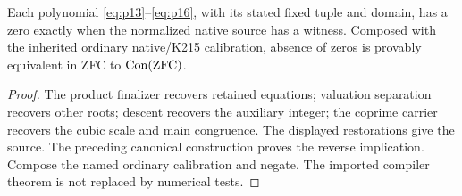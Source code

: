 \begin{theorem}\label{thm:integer}
Each polynomial \eqref{eq:p13}--\eqref{eq:p16}, with its stated fixed
tuple and domain, has a zero exactly when the normalized native source
has a witness. Composed with the inherited ordinary native/K215
calibration, absence of zeros is provably equivalent in ZFC to
$\operatorname{Con}(\mathrm{ZFC})$.
\end{theorem}
\begin{proof}
The product finalizer recovers retained equations; valuation separation
recovers other roots; descent recovers the auxiliary integer; the coprime
carrier recovers the cubic scale and main congruence. The displayed
restorations give the source. The preceding canonical construction proves
the reverse implication. Compose the named ordinary calibration and
negate. The imported compiler theorem is not replaced by numerical tests.
\end{proof}
